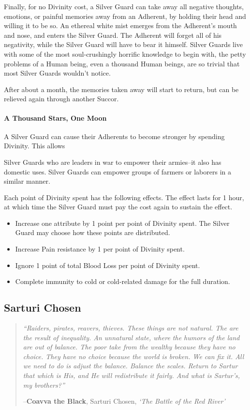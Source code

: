 \documentclass[oneside,11pt,english]{book}
\begin{document}
Finally, for no Divinity cost, a Silver Guard can take away all negative thoughts, emotions, or 
painful memories away from an Adherent, by holding their head and willing it to be so. An 
ethereal white mist emerges from the Adherent's mouth and nose, and enters the Silver Guard. 
The Adherent will forget all of his negativity, while the Silver Guard will have to bear it himself. 
Silver Guards live with some of the most soul-crushingly horrific knowledge to begin with, the 
petty problems of a Human being, even a thousand Human beings, are so trivial that most Silver 
Guards wouldn't notice. 


After about a month, the memories taken away will start to return, but can be relieved again 
through another Succor. 


\paragraph{A Thousand Stars, One Moon}
A Silver Guard can cause their Adherents to become stronger by spending Divinity. This allows 


Silver Guards who are leaders in war to empower their armies--it also has domestic uses. Silver 
Guards can empower groups of farmers or laborers in a similar manner. 


Each point of Divinity spent has the following effects. The effect lasts for 1 hour, at which time 
the Silver Guard must pay the cost again to sustain the effect. 
\begin{itemize}
\item Increase one attribute by 1 point per point of Divinity spent. The Silver Guard may 
choose how these points are distributed. 
\item Increase Pain resistance by 1 per point of Divinity spent. 
\item Ignore 1 point of total Blood Loss per point of Divinity spent. 
\item Complete immunity to cold or cold-related damage for the full duration. 
\end{itemize}
\subsection{Sarturi Chosen}
\begin{quotation}
	{\emph{“Raiders, pirates, reavers, thieves. These things are not natural. The are the result of inequality. An unnatural state, where the humors of the land are out of balance. The poor take from the wealthy because they have no choice. They have no choice because the world is broken. We can fix it. All we need to do is adjust the balance. Balance the scales. Return to Sartur that which is His, and He will redistribute it fairly. And what is Sartur’s, my brothers?”}

\hfill--\textbf{Coavva the Black}, Sarturi Chosen, \textit{‘The Battle of the Red River’}}
\end{quotation}
\end{document}
